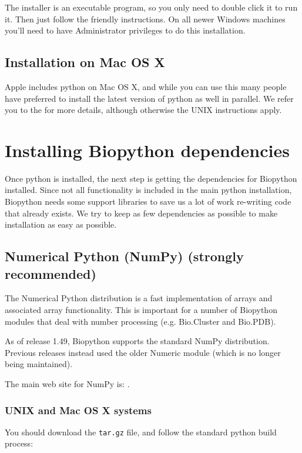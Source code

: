 \documentclass{article}
\begin{document}
The installer is an executable program, so you only need to double click
it to run it. Then just follow the friendly instructions. On all newer Windows
machines you'll need to have Administrator privileges to do this
installation.

\subsection{Installation on Mac OS X}

Apple includes python on Mac OS X, and while you can use this many people have
preferred to install the latest version of python as well in parallel.  We refer
you to the  for more details, although
otherwise the UNIX instructions apply.

\section{Installing Biopython dependencies}

Once python is installed, the next step is getting the dependencies
for Biopython installed. Since not all functionality is included in the
main python installation, Biopython needs some support libraries to save
us a lot of work re-writing code that already exists. We try to keep
as few dependencies as possible to make installation as easy as
possible.

\subsection{Numerical Python (NumPy) (strongly recommended)}

The Numerical Python distribution is a fast implementation of arrays and
associated array functionality. This is important for a number of Biopython
modules that deal with number processing (e.g. Bio.Cluster and Bio.PDB).

As of release 1.49, Biopython supports the standard NumPy distribution.
Previous releases instead used the older Numeric module (which is no
longer being maintained).

The main web site for NumPy is:
.

\subsubsection{UNIX and Mac OS X systems}

You should download the \verb|tar.gz| file, and follow the standard python
build process:
\end{document}
